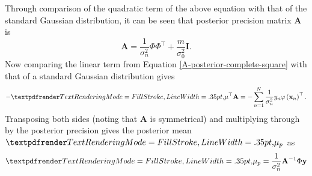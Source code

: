 Through comparison of the quadratic term of the above equation with that of the standard Gaussian distribution, it can be seen that posterior precision matrix $\mathbf{A}$ is
\begin{equation}
    \mathbf{A}=\frac{1}{\sigma_{n}^{2}} \Phi \Phi^{\top} + \frac{m}{\sigma_{0}^2}\mathbf{I}.
\end{equation}
Now comparing the linear term from Equation \ref{A-posterior-complete-square} with that of a standard Gaussian distribution gives
\begin{equation}
    - \boldgreek{\mu}^{\top} \mathbf{A}=-\sum_{n=1}^{N}  \frac{1}{\sigma_{n}^{2}} y_{n} \varphi\left(\mathbf{x}_{n}\right)^{\top}.
\end{equation}
Transposing both sides (noting that $\mathbf{A}$ is symmetrical) and multiplying through by the posterior precision gives the posterior mean $\boldgreek{\mu}_{p}$ as
\begin{equation}
    \boldgreek{\mu}_{p}=\frac{1}{\sigma_{n}^{2}}\mathbf{A}^{-1} \Phi \mathbf{y}
\end{equation}

